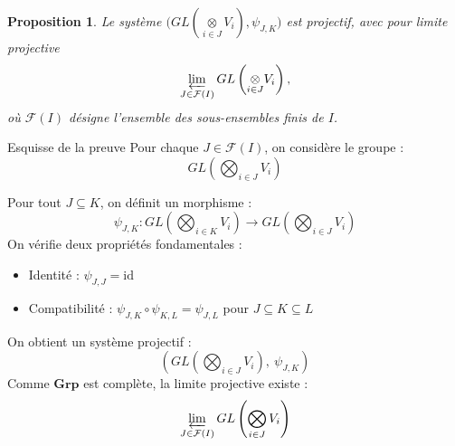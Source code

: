 \documentclass[9pt]{beamer}
\newtheorem{proposition}{Proposition}
\begin{document}
\begin{frame}
\begin{proposition}
Le système $\big(GL(\underset{i \in J}{\otimes} V_i), \psi_{J,K} \big)$ est projectif, avec pour limite projective
	\[
	\varprojlim_{J \in \mathcal{F}(I)} GL\left(\underset{i \in J}{\otimes} V_i\right),
	\]
	où $\mathcal{F}(I)$ désigne l’ensemble des sous-ensembles finis de $I$.
\end{proposition}

\end{frame}


\begin{frame}{Esquisse de la preuve}
	Pour chaque \( J \in \mathcal{F}(I) \), on considère le groupe :
	\[
	GL\left( \bigotimes_{i \in J} V_i \right)
	\]
	

	Pour tout \( J \subseteq K \), on définit un morphisme :
	\[
	\psi_{J,K} :
	GL\left( \bigotimes_{i \in K} V_i \right)
	\longrightarrow
	GL\left( \bigotimes_{i \in J} V_i \right)
	\]
On vérifie deux propriétés fondamentales :
	\begin{itemize}
		\item Identité : \( \psi_{J,J} = \mathrm{id} \)
		\item Compatibilité : \( \psi_{J,K} \circ \psi_{K,L} = \psi_{J,L} \) pour \( J \subseteq K \subseteq L \)
	\end{itemize}
	
	On obtient un système projectif :
	\[
	\left( GL\left( \bigotimes_{i \in J} V_i \right),\ \psi_{J,K} \right)
	\]	
Comme \( \mathbf{Grp} \) est complète, la limite projective existe :
\[
\varprojlim_{J \in \mathcal{F}(I)} GL\left( \bigotimes_{i \in J} V_i \right)
\]
\end{frame}
\end{document}
